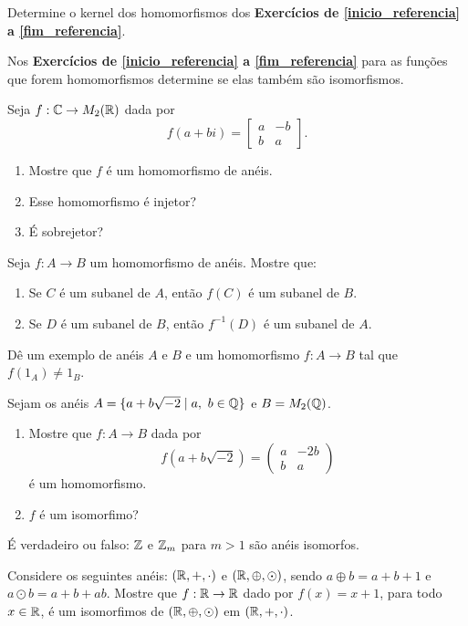 \documentclass[12pt]{article}
\begin{document}
\vesp

\questao{}
	Determine o kernel dos homomorfismos dos \textbf{Exerc{\'i}cios de \ref{inicio_referencia} a \ref{fim_referencia}}.


\vesp

\questao{}
	Nos \textbf{Exercícios de \ref{inicio_referencia} a \ref{fim_referencia}} para as funções que forem homomorfismos determine se elas também são isomorfismos.


\vesp

\questao{}
	Seja $f : \mathbb{C} \to M_2(\mathbb{R})$ dada por
\[
	f(a + bi) = \begin{bmatrix}
		a & -b\\
		b & a
	\end{bmatrix}.
\]
\begin{enumerate}[label=({\alph*})]
	\item Mostre que $f$ é um homomorfismo de anéis.
	\item Esse homomorfismo é injetor?
	\item É sobrejetor?
\end{enumerate}


\vesp

\questao{}
	Seja $f: A \to B$ um homomorfismo de an{\'e}is. Mostre que:
\begin{enumerate}[label=({\alph*})]
\item Se $C$  {\'e} um subanel de $A$, ent{\~a}o $f(C)$ {\'e} um subanel de $B$.
\item Se $D$ {\'e} um subanel de $B$, ent{\~a}o $f^{-1}(D)$ {\'e} um subanel de $A$.
\end{enumerate}


\vesp

\questao{}
	D{\^e} um exemplo de an{\'e}is $A$ e $B$ e um homomorfismo $f : A \to B$ tal que $f(1_A) \ne 1_B$.


\vesp

\questao{}
	Sejam os an{\'e}is $A = \{ a + b\sqrt{-2} \mid a,\ b \in \mathbb{Q}\}$ e $B = M_2(\mathbb{Q})$.
\begin{enumerate}[label=({\alph*})]
\item Mostre que $f : A \to B$ dada por
\[
f(a + b\sqrt{-2}) =
\begin{pmatrix}
a & -2b\\
b & a
\end{pmatrix}
\]
{\'e} um homomorfismo.
\item $f$ {\'e} um isomorfimo?
\end{enumerate}


\vesp

\questao{}
	{\'E} verdadeiro ou falso: $\mathbb{Z}$ e $\mathbb{Z}_{m}$ para $m > 1$ s{\~a}o an{\'e}is
isomorfos.


\vesp

\questao{}
	Considere os seguintes an{\'e}is: $(\mathbb{R}, +, \cdot)$ e $(\mathbb{R}, \oplus, \odot)$, sendo $a \oplus b = a + b + 1$ e $a \odot b = a + b + ab$. Mostre que $f : \mathbb{R} \to \mathbb{R}$ dado por $f(x) = x + 1$, para todo $x \in \mathbb{R}$, {\'e} um isomorfimos de $(\mathbb{R}, \oplus, \odot)$ em $(\mathbb{R}, +, \cdot)$.
\end{document}
